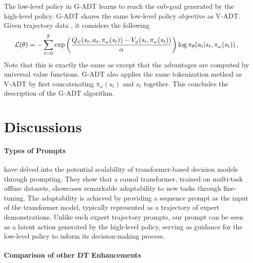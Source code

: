 The low-level policy in G-ADT learns to reach the sub-goal generated by the high-level policy.  
G-ADT shares the same low-level policy objective as V-ADT. 
Given trajectory data , it considers the following 
\begin{align*}
{\mathcal{L}}(\theta) = -\sum_{t=0}^T \exp\left( \frac{Q_{\psi}(s_t,a_t, \pi_\omega(s_t)) - V_{\phi}(s_t, \pi_\omega(s_t))}{\alpha}  \right) \log \pi_{\theta} (a_t | s_t, \pi_\omega(s_t))\, ,
\end{align*}
Note that this is exactly the same as  except that the advantages are computed by  universal value functions. 
G-ADT also applies the same tokenization method as V-ADT by first concatenating $\pi_\omega(s_t)$ and $s_t$ together.  
This concludes the description of the G-ADT algorithm. 

\section{Discussions}

\paragraph{Types of Prompts} 

\citet{reed2022generalist} have delved into the potential scalability of transformer-based decision models through prompting. 
They show that a causal transformer, trained on multi-task offline datasets, showcases remarkable adaptability to new tasks through fine-tuning. The adaptability is achieved by providing a sequence prompt as the input of the transformer model, typically represented as a trajectory of expert demonstrations. 
Unlike such expert trajectory prompts, our prompt can be seen as a latent action generated by the high-level policy, serving as guidance for the low-level policy to inform its decision-making process.

\paragraph{Comparison of other DT Enhancements}

